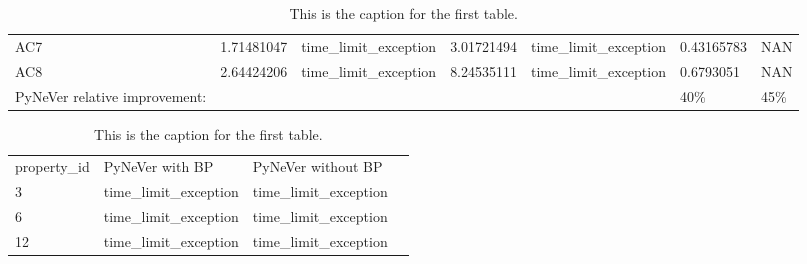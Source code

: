 \begin{table}[]
{\begin{tabular}{@{}lllllll@{}}
    AC7     & {\color[HTML]{ACB9CA} 1.71481047} & {\color[HTML]{ACB9CA} time\_limit\_exception} & {\color[HTML]{ACB9CA} 3.01721494} & {\color[HTML]{ACB9CA} time\_limit\_exception} & {\color[HTML]{ACB9CA} 0.43165783} & {\color[HTML]{ACB9CA} NAN}        \\
    AC8     & {\color[HTML]{ACB9CA} 2.64424206} & {\color[HTML]{ACB9CA} time\_limit\_exception} & {\color[HTML]{ACB9CA} 8.24535111} & {\color[HTML]{ACB9CA} time\_limit\_exception} & {\color[HTML]{ACB9CA} 0.6793051}  & {\color[HTML]{ACB9CA} NAN}        \\\cmidrule(r){1-7}
    PyNeVer relative improvement:        &                                   &                                               &                                   &                                               & {\color[HTML]{FF0000} 40\%}       & {\color[HTML]{FF0000} 45\%}       \\\cmidrule(r){1-7}
    \end{tabular}%
    }
    \caption{This is the caption for the first table.}
    \label{table:ACAS}
    \end{table}


\begin{table}[]
    \centering
    \begin{tabular}{@{}llll@{}}
    \toprule
    property\_id & PyNeVer with BP                               & PyNeVer without BP                            &  \\ \cmidrule(r){1-3}
    3            & {\color[HTML]{ACB9CA} time\_limit\_exception} & {\color[HTML]{ACB9CA} time\_limit\_exception} &  \\
    6            & {\color[HTML]{ACB9CA} time\_limit\_exception} & {\color[HTML]{ACB9CA} time\_limit\_exception} &  \\
    12           & {\color[HTML]{ACB9CA} time\_limit\_exception} & {\color[HTML]{ACB9CA} time\_limit\_exception} &  \\ \cmidrule(r){1-3}
    \end{tabular}%
    \caption{This is the caption for the first table.}
    \label{table:DUBINS}
\end{table}

